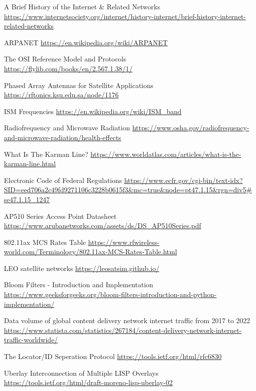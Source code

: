 \documentclass[11pt]{article}
\begin{document}
\pagebreak
\begin{thebibliography}{7}


A Brief History of the Internet \& Related Networks
\url{https://www.internetsociety.org/internet/history-internet/brief-history-internet-related-networks}

ARPANET
\url{https://en.wikipedia.org/wiki/ARPANET}

The OSI Reference Model and Protocols
\url{https://flylib.com/books/en/2.567.1.38/1/}

Phased Array Antennas for Satellite Applications
\url{https://rftonics.ksu.edu.sa/node/1176}

ISM Frequencies
\url{https://en.wikipedia.org/wiki/ISM_band}

Radiofrequency and Microwave Radiation
\url{https://www.osha.gov/radiofrequency-and-microwave-radiation/health-effects}

What Is The Karman Line?
\url{https://www.worldatlas.com/articles/what-is-the-karman-line.html}

Electronic Code of Federal Regulations
\url{https://www.ecfr.gov/cgi-bin/text-idx?SID=eed706a2c49fd9271106c3228b0615f3&mc=true&node=pt47.1.15&rgn=div5#se47.1.15_1247}

AP510 Series Access Point Datasheet
\url{https://www.arubanetworks.com/assets/ds/DS_AP510Series.pdf}

802.11ax MCS Rates Table
\url{https://www.rfwireless-world.com/Terminology/802.11ax-MCS-Rates-Table.html}

LEO satellite networks
\url{https://leosatsim.github.io/}

Bloom Filters - Introduction and Implementation
\url{https://www.geeksforgeeks.org/bloom-filters-introduction-and-python-implementation/}

 Data volume of global content delivery network internet traffic from 2017 to 2022 
\url{https://www.statista.com/statistics/267184/content-delivery-network-internet-traffic-worldwide/}

The Locator/ID Seperation Protocol 
\url{https://tools.ietf.org/html/rfc6830}

Uberlay Interconnection of Multiple LISP Overlays
\url{https://tools.ietf.org/html/draft-moreno-lisp-uberlay-02}


\end{thebibliography}
\end{document}
